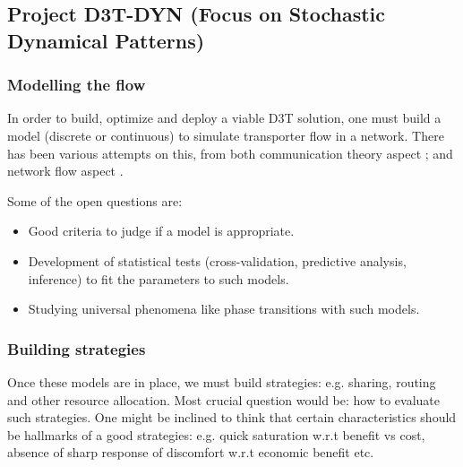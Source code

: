 \subsection*{Project D3T-DYN (Focus on Stochastic Dynamical Patterns)}

\subsubsection*{Modelling the flow}
In order to  build, optimize and deploy a viable D3T solution, one must build a model
(discrete or continuous) to simulate transporter flow in a network. There has been various attempts on this,
from both communication theory aspect \cite{zhang_communication_2011, arenas_communication_2001}; and network flow aspect
\cite{de_martino_minimal_2009,sole-ribalta_model_2016,tan_hybrid_2013}. 

Some of the open questions are:
\begin{itemize}
\item Good criteria to judge if a model is appropriate. 
\item Development of statistical tests (cross-validation, predictive analysis, inference) to fit the parameters to such models. 
\item Studying universal phenomena like phase transitions with such models.
\end{itemize}

\subsubsection*{Building strategies}
Once these models are in place, we must build strategies: e.g. sharing, routing and other resource allocation.
Most crucial question would be: how to evaluate such strategies. One might be inclined to think that certain characteristics
should be hallmarks of a good strategies: e.g. quick saturation w.r.t benefit vs cost, absence of sharp response of discomfort 
w.r.t economic benefit etc. 